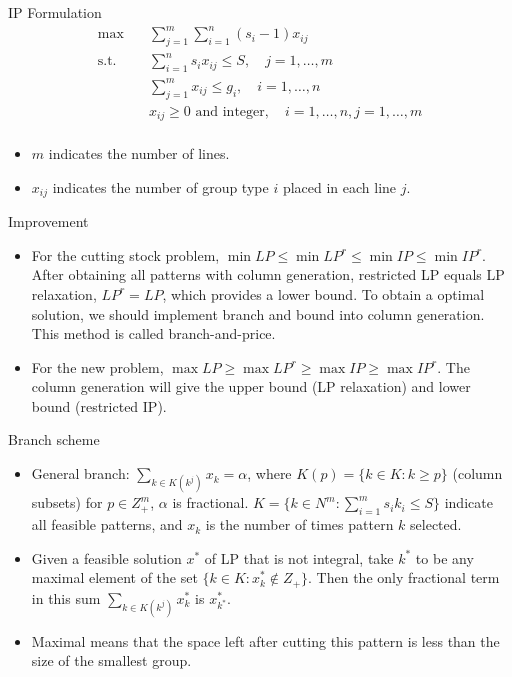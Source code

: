     \begin{frame}{IP Formulation}
      \[\begin{split}\mbox{max}\quad & \sum_{j=1}^{m} \sum_{i=1}^n (s_i-1) x_{ij} \\
      \mbox{s.t.} \quad & \sum_{i=1}^n s_i x_{ij} \leq S, \quad j=1,\ldots,m \\
      & \sum_{j=1}^{m} x_{ij} \leq g_i ,\quad i=1,\ldots,n \\
      & x_{ij} \geq 0 \mbox{ and integer}, \quad i=1,\ldots,n, j=1,\ldots,m \\\end{split}\]
      \begin{itemize}
        \item $m$ indicates the number of lines.
        \item $x_{ij}$ indicates the number of group type $i$ placed in each line $j$.
      \end{itemize}
    \end{frame}

    \begin{frame}{Improvement}
      \begin{itemize}
        \item For the cutting stock problem, $\min LP \leq \min LP^r \leq \min IP \leq \min IP^r$.
        After obtaining all patterns with column generation, restricted LP equals LP relaxation, $LP^r = LP$, which provides a lower bound. To obtain a optimal solution, we should implement branch and bound into column generation. This method is called branch-and-price.
        \item For the new problem, $\max LP \geq \max LP^r \geq \max IP \geq \max IP^r$. The column generation will give the upper bound (LP relaxation) and lower bound (restricted IP).
      \end{itemize}
    \end{frame}

    \begin{frame}{Branch scheme}
      \begin{itemize}
        \item General branch:
        $\sum_{k \in K\left(k^{j}\right)} x_{k} = \alpha$, where $K(p) = \{k \in K: k\geq p\}$ (column subsets) for $p \in Z^m_+$, $\alpha$ is fractional.
        $K = \{k \in N^m: \sum_{i=1}^m s_i k_i \leq S\}$ indicate all feasible patterns, and $x_k$ is the number of times pattern $k$ selected.
        \vspace{10pt}
        \item Given a feasible solution $x^*$ of LP that is not integral, take $k^*$ to be any maximal element of the set $\{k \in K: x_k^* \notin Z_+\}$. Then the only fractional term in this sum $\sum_{k \in K\left(k^{j}\right)} x_{k}^*$ is $x_{k^*}^*$.
        \vspace{10pt}
        \item Maximal means that the space left after cutting this pattern is less than the size of the smallest group.
      \end{itemize}
    \end{frame}

